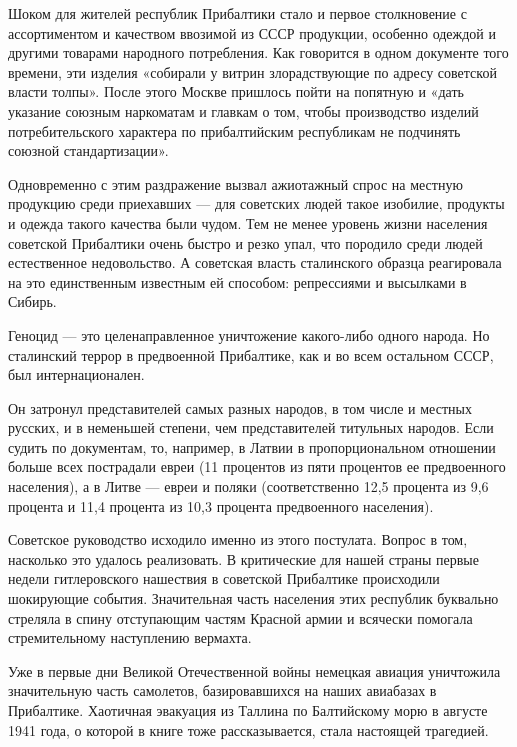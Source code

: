 Шоком для жителей республик Прибалтики стало и первое столкновение с
ассортиментом и качеством ввозимой из СССР продукции, особенно одеждой и
другими товарами народного потребления. Как говорится в одном документе того
времени, эти изделия «собирали у витрин злорадствующие по адресу советской
власти толпы». После этого Москве пришлось пойти на попятную и «дать указание
союзным наркоматам и главкам о том, чтобы производство изделий потребительского
характера по прибалтийским республикам не подчинять союзной стандартизации».

Одновременно с этим раздражение вызвал ажиотажный спрос на местную продукцию
среди приехавших — для советских людей такое изобилие, продукты и одежда такого
качества были чудом. Тем не менее уровень жизни населения советской Прибалтики
очень быстро и резко упал, что породило среди людей естественное недовольство.
А советская власть сталинского образца реагировала на это единственным
известным ей способом: репрессиями и высылками в Сибирь.


Геноцид — это целенаправленное уничтожение какого-либо одного народа. Но
сталинский террор в предвоенной Прибалтике, как и во всем остальном СССР, был
интернационален.

Он затронул представителей самых разных народов, в том числе и местных русских,
и в неменьшей степени, чем представителей титульных народов. Если судить по
документам, то, например, в Латвии в пропорциональном отношении больше всех
пострадали евреи (11 процентов из пяти процентов ее предвоенного населения), а
в Литве — евреи и поляки (соответственно 12,5 процента из 9,6 процента и 11,4
процента из 10,3 процента предвоенного населения).


Советское руководство исходило именно из этого постулата. Вопрос в том,
насколько это удалось реализовать. В критические для нашей страны первые недели
гитлеровского нашествия в советской Прибалтике происходили шокирующие события.
Значительная часть населения этих республик буквально стреляла в спину
отступающим частям Красной армии и всячески помогала стремительному наступлению
вермахта.

Уже в первые дни Великой Отечественной войны немецкая авиация уничтожила
значительную часть самолетов, базировавшихся на наших авиабазах в Прибалтике.
Хаотичная эвакуация из Таллина по Балтийскому морю в августе 1941 года, о
которой в книге тоже рассказывается, стала настоящей трагедией.

